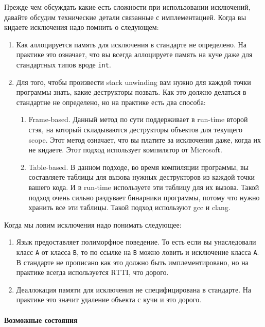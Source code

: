 Прежде чем обсуждать какие есть сложности при использовании исключений, давайте обсудим технические детали связанные с имплементацией.
Когда вы кидаете исключения надо помнить о следующем:
\begin{enumerate}
\item Как аллоцируется память для исключения в стандарте не определено.
На практике это означает, что вы всегда аллоцируете память на куче даже для стандартных типов вроде \verb"int".

\item Для того, чтобы произвести stack unwinding вам нужно для каждой точки программы знать, какие деструкторы позвать.
Как это должно делаться в стандартне не определено, но на практике есть два способа:
\begin{enumerate}
\item Frame-based.
Данный метод по сути поддерживает в run-time второй стэк, на который складываются деструкторы объектов для текущего scope.
Этот метод означает, что вы платите за исключения даже, когда их не кидаете.
Этот подход использует компилятор от Microsoft.

\item Table-based.
В данном подходе, во время компиляции программы, вы составляете таблицы для вызова нужных деструкторов из каждой точки вашего кода.
И в run-time используете эти таблицу для их вызова.
Такой подход очень сильно раздувает бинарники программы, потому что нужно хранить все эти таблицы.
Такой подход используют gcc и clang.
\end{enumerate}
\end{enumerate}
Когда мы ловим исключения надо понимать следующее:
\begin{enumerate}
\item Язык предоставляет полиморфное поведение.
То есть если вы унаследовали класс \verb"A" от класса \verb"B", то по ссылке на \verb"B" можно ловить и исключение класса \verb"A".
В стандарте не прописано как это должно быть имплементировано, но на практике всегда используется RTTI, что дорого.

\item Деаллокация памяти для исключения не специфицирована в стандарте.
На практике это значит удаление объекта с кучи и это дорого.
\end{enumerate}

\paragraph{Возможные состояния}

